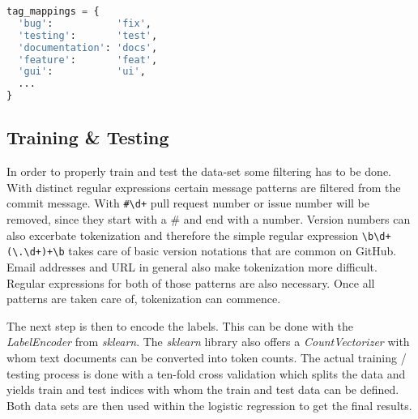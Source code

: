 \begin{lstlisting}[language=python, label={lst:tag_map}, caption={Dictionary for conventional tag mappings}]
tag_mappings = {
  'bug':           'fix',
  'testing':       'test',
  'documentation': 'docs',
  'feature':       'feat',
  'gui':           'ui',
  ...
}
\end{lstlisting}

\subsection{Training \& Testing}

In order to properly train and test the data-set some filtering has to be done.
With distinct regular expressions certain message patterns are filtered from
the commit message. With \lstinline{#\d+} pull request number or issue number
will be removed, since they start with a \# and end with a number. Version
numbers can also excerbate tokenization and therefore the simple regular
expression \lstinline{\b\d+(\.\d+)+\b} takes care of basic version notations
that are common on GitHub. Email addresses and URL in general also make
tokenization more difficult. Regular expressions for both of those patterns are
also necessary. Once all patterns are taken care of, tokenization can commence.

The next step is then to encode the labels. This can be done  with the
\textit{LabelEncoder} from \textit{sklearn}. The \textit{sklearn} library also
offers a \textit{CountVectorizer} with whom text documents can be converted
into token counts. The actual training / testing process is done with a
ten-fold cross validation which splits the data and yields train and test
indices with whom the train and test data can be defined. Both data sets are
then used within the logistic regression to get the final results.
